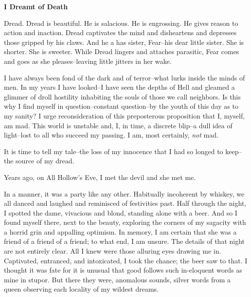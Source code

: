 \documentclass{article}
\begin{document}


\begin{center}
\large\textbf{I Dreamt of Death}
\end{center}



\noindent
Dread.
Dread is beautiful.  He is salacious.  He is engrossing.
He gives reason to action and inaction.
Dread captivates the mind and disheartens and depresses
those gripped by his claws.
And he a has sister, Fear--his dear little sister.
She is shorter.  She is sweeter.
While Dread lingers and attaches parasitic,
Fear comes and goes as she pleases--leaving
little jitters in her wake.


I have always been fond of the dark and of terror--what
lurks inside the minds of men. In my years
I have looked--I have seen the depths of Hell
and gleamed a glimmer of droll hostility
inhabiting the souls of those we call neighbors.
Is this why I find myself in question--constant question--by
the youth of this day as to my sanity?
I urge reconsideration of this preposterous proposition that
I, myself, am mad.
This world is unstable and, I, in time, a discrete blip--a
dull idea of light--lost to all who succeed my passing.
I am, most certainly, \textit{not} mad.
\VV


\noindent %
It is time to tell my tale--the
loss of my innocence that I had so longed to keep--the
source of my dread.
\VV


\noindent
Years ago, on All Hollow's Eve,
I met the devil and she met me.
\VV


\noindent
In a manner, it was a party like any other.
Habitually incoherent by whiskey,
we all danced and laughed and reminisced of festivities past.
Half through the night, I spotted the dame,
vivacious and blond, standing alone with a beer.
And so I found myself there, next to the beauty,
exploring the corners of my sagacity with a horrid
grin and appalling optimism.
In memory, I am certain that she was a friend of
a friend of a friend; to what end, I am unsure.
The details of that night are not entirely clear.
All I knew were those alluring eyes drawing me in.
Captivated, entranced, and intoxicated,
I took the chance; the beer saw to that.
I thought it was fate for it is unusual
that good follows such in-eloquent words
as mine in stupor.
But there they were, anomalous sounds,
silver words from a queen observing each
locality of my wildest dreams.
\end{document}
